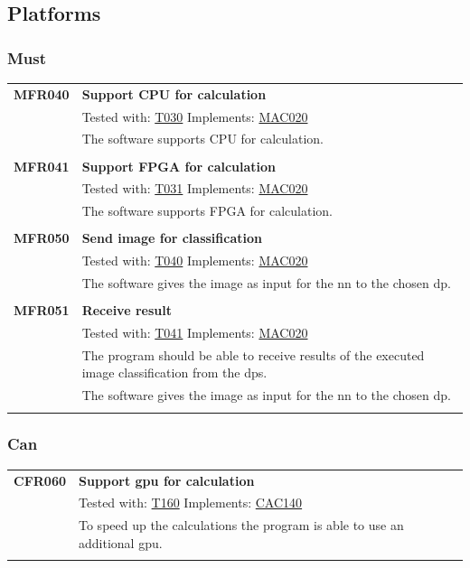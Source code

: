 \documentclass[parskip=full]{scrartcl}
\begin{document}
\subsection{Platforms}
\subsubsection{Must}
\begin{tabular}{p{2cm}p{11.4cm}}
\textbf {MFR040}\hypertarget{MFR030} & \textbf{Support CPU for calculation} \\
& Tested with: \hyperlink{T030}{T030} Implements: \hyperlink{MAC020}{MAC020} \\
& The software supports CPU for calculation. \\
& \\
\textbf {MFR041}\hypertarget{MFR031}  & \textbf{Support FPGA for calculation} \\
& Tested with: \hyperlink{T031}{T031} Implements: \hyperlink{MAC020}{MAC020} \\
& The software supports FPGA for calculation. \\
& \\
\textbf {MFR050} \hypertarget{MFR040}& \textbf{Send image for classification} \\
& Tested with: \hyperlink{T040}{T040} Implements: \hyperlink{MAC020}{MAC020} \\
& The software gives the image as input for the \gls{nn} to the chosen \gls{dp}. \\
& \\
\textbf {MFR051} \hypertarget{MFR041}& \textbf{Receive result} \\
& Tested with: \hyperlink{T041}{T041} Implements: \hyperlink{MAC020}{MAC020} \\
& The program should be able to receive results of the executed \gls{image classification} from the \glspl{dp}. \\
& The software gives the image as input for the {nn} to the chosen \gls{dp}. \\
& \\
\end{tabular}
\subsubsection{Can}
\begin{tabular}{p{2cm}p{11.4cm}}
\textbf {CFR060} \hypertarget{CFR160} & \textbf{Support \gls{gpu} for calculation} \\
& Tested with: \hyperlink{T160}{T160} Implements: \hyperlink{CAC140}{CAC140} \\
& To speed up the calculations the program is able to use an additional \gls{gpu}.\\
& \\
\end{tabular}
\end{document}

